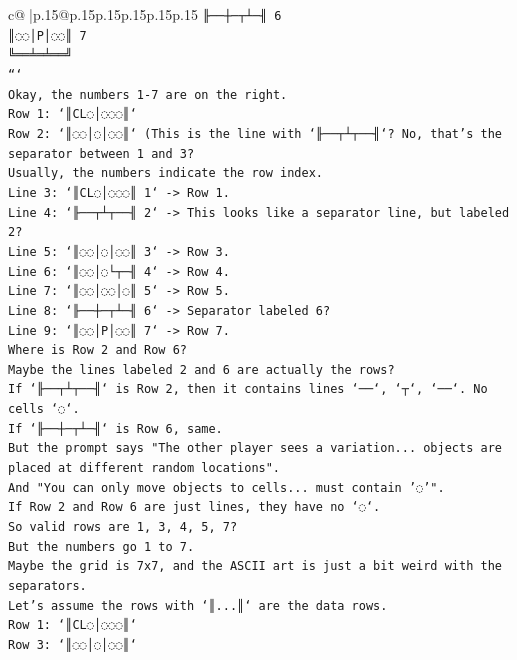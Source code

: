 \documentclass{article}
\begin{document}
{\begin{supertabular}{c@{$\;$}|p{.15\linewidth}@{}p{.15\linewidth}p{.15\linewidth}p{.15\linewidth}p{.15\linewidth}p{.15\linewidth}}
{{{\texttt{╟──┼─┬┴─╢ 6} \\
\texttt{║◌◌│P│◌◌║ 7} \\
\texttt{╚══╧═╧══╝} \\
\texttt{```} \\
\texttt{Okay, the numbers 1{-}7 are on the right.} \\
\texttt{Row 1: `║CL◌│◌◌◌║`} \\
\texttt{Row 2: `║◌◌│◌│◌◌║` (This is the line with `╟──┬┴┬──╢`? No, that's the separator between 1 and 3?} \\
\texttt{Usually, the numbers indicate the row index.} \\
\texttt{Line 3: `║CL◌│◌◌◌║ 1` {-}> Row 1.} \\
\texttt{Line 4: `╟──┬┴┬──╢ 2` {-}> This looks like a separator line, but labeled 2?} \\
\texttt{Line 5: `║◌◌│◌│◌◌║ 3` {-}> Row 3.} \\
\texttt{Line 6: `║◌◌│◌└┬─╢ 4` {-}> Row 4.} \\
\texttt{Line 7: `║◌◌│◌◌│◌║ 5` {-}> Row 5.} \\
\texttt{Line 8: `╟──┼─┬┴─╢ 6` {-}> Separator labeled 6?} \\
\texttt{Line 9: `║◌◌│P│◌◌║ 7` {-}> Row 7.} \\
\texttt{Where is Row 2 and Row 6?} \\
\texttt{Maybe the lines labeled 2 and 6 are actually the rows?} \\
\texttt{If `╟──┬┴┬──╢` is Row 2, then it contains lines `──`, `┬`, `──`. No cells `◌`.} \\
\texttt{If `╟──┼─┬┴─╢` is Row 6, same.} \\
\texttt{But the prompt says "The other player sees a variation... objects are placed at different random locations".} \\
\texttt{And "You can only move objects to cells... must contain '◌'".} \\
\texttt{If Row 2 and Row 6 are just lines, they have no `◌`.} \\
\texttt{So valid rows are 1, 3, 4, 5, 7?} \\
\texttt{But the numbers go 1 to 7.} \\
\texttt{Maybe the grid is 7x7, and the ASCII art is just a bit weird with the separators.} \\
\texttt{Let's assume the rows with `║...║` are the data rows.} \\
\texttt{Row 1: `║CL◌│◌◌◌║`} \\
\texttt{Row 3: `║◌◌│◌│◌◌║`} \\
}}}
\end{supertabular}}
\end{document}

